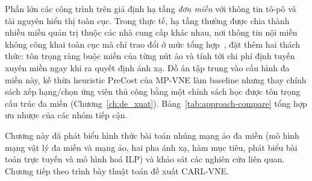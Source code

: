 \documentclass[../DoAn.tex]{subfiles}
\begin{document}
Phần lớn các công trình trên giả định hạ tầng \textit{đơn miền} với thông tin tô-pô và tài nguyên hiển thị toàn cục. Trong thực tế, hạ tầng thường được chia thành nhiều miền quản trị thuộc các nhà cung cấp khác nhau, nơi thông tin nội miền không công khai toàn cục mà chỉ trao đổi ở mức tổng hợp~\cite{cao2019vne_survey}, đặt thêm hai thách thức: tôn trọng ràng buộc miền của từng nút ảo và tính tới chi phí định tuyến xuyên miền ngay khi ra quyết định ánh xạ. Đồ án tập trung vào cấu hình đa miền này, kế thừa heuristic PreCost của MP-VNE làm baseline nhưng thay chính sách xếp hạng/chọn ứng viên thủ công bằng một chính sách học được tôn trọng cấu trúc đa miền (Chương~\ref{ch:de_xuat}). Bảng~\ref{tab:approach-compare} tổng hợp ưu nhược của các nhóm tiếp cận.

\begin{table}[h]
\centering
\caption{So sánh các hướng tiếp cận VNE}
\label{tab:approach-compare}
\end{table}

Chương này đã phát biểu hình thức bài toán nhúng mạng ảo đa miền (mô hình mạng vật lý đa miền và mạng ảo, hai pha ánh xạ, hàm mục tiêu, phát biểu bài toán trực tuyến và mô hình hoá ILP) và khảo sát các nghiên cứu liên quan. Chương tiếp theo trình bày thuật toán đề xuất CARL-VNE.
\end{document}
